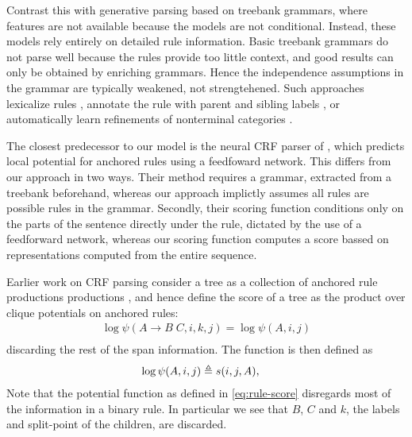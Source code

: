 Contrast this with generative parsing based on treebank grammars, where features are not available because the models are not conditional. Instead, these models rely entirely on detailed rule information. Basic treebank grammars do not parse well because the rules provide too little context, and good results can only be obtained by enriching grammars. Hence the independence assumptions in the grammar are typically weakened, not strengtehened. Such approaches lexicalize rules \citep{collins2003head}, annotate the rule with parent and sibling labels \citep{klein2003accurate}, or automatically learn refinements of nonterminal categories \citep{petrov2006learning}.

The closest predecessor to our model is the neural CRF parser of \citet{klein2015crf}, which predicts local potential for anchored rules using a feedfoward network. This differs from our approach in two ways. Their method requires a grammar, extracted from a treebank beforehand, whereas our approach implictly assumes all rules are possible rules in the grammar. Secondly, their scoring function conditions only on the parts of the sentence directly under the rule, dictated by the use of a feedforward network, whereas our scoring function computes a score bassed on representations computed from the entire sequence.

Earlier work on CRF parsing consider a tree as a collection of anchored rule productions productions \cite{finkel2008crf,klein2015crf}, and hence define the score of a tree as the product over clique potentials on anchored rules:
\begin{align}
  \log\psi(A \to B \;C, i, k, j) = \log\psi(A, i, j)\\
\end{align}
discarding the rest of the span information. The function is then defined as
\begin{align}
  \label{eq:span-score}
  \log\psi(A, i, j) &\triangleq s(i, j, A),
\end{align}
Note that the potential function as defined in \ref{eq:rule-score} disregards most of the information in a binary rule. In particular we see that $B$, $C$ and $k$, the labels and split-point of the children, are discarded.



